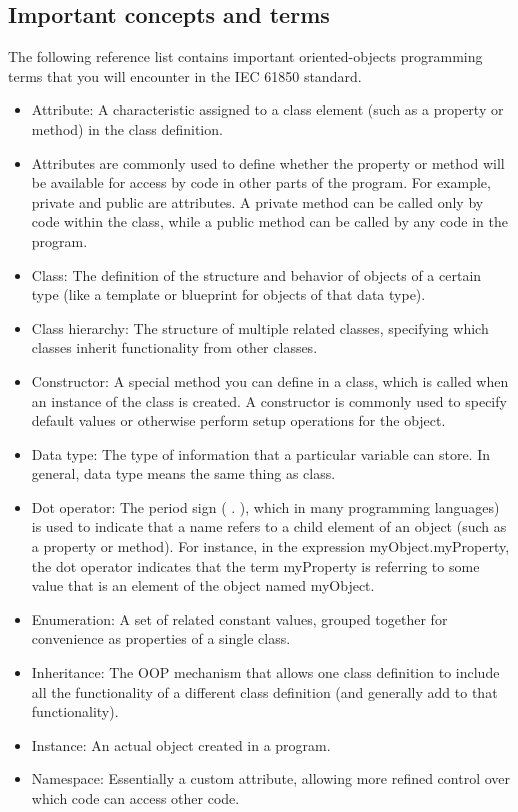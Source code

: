 \subsection{Important concepts and terms}

The following reference list contains important 
oriented-objects programming terms 
that you will encounter in the IEC 61850 standard. 
\begin{itemize}
  \item Attribute: A characteristic assigned to a class 
  element (such as a property or method) in the class definition.
  \item Attributes are commonly used to define whether 
  the property or method will be available for access by 
  code in other parts of the program. For example, 
  private and public are attributes. A private method 
  can be called only by code within the class, while a public 
  method can be called by any code in the program.
  \item Class: The definition of the structure and behavior 
  of objects of a certain type (like a template or 
  blueprint for objects of that data type).
  \item Class hierarchy: The structure of multiple 
  related classes, specifying which classes inherit 
  functionality from other classes.
  \item Constructor: A special method you can define in 
  a class, which is called when an instance of the 
  class is created. A constructor is commonly used to 
  specify default values or otherwise perform setup 
  operations for the object.
  \item Data type: The type of information that a 
  particular variable can store. In general, data 
  type means the same thing as class.
  \item Dot operator: The period sign ( . ), which 
  in many programming languages) is used to 
  indicate that a name refers 
  to a child element of an object (such as a 
  property or method). For instance, in the expression 
  myObject.myProperty, the dot operator indicates 
  that the term  myProperty is referring to some 
  value that is an element of the object named myObject.
  \item Enumeration: A set of related constant 
  values, grouped together for convenience as properties 
  of a single class.
  \item Inheritance: The OOP mechanism that allows one 
  class definition to include all the functionality 
  of a different class definition (and generally 
  add to that functionality).
  \item Instance: An actual object created in a program.
  \item Namespace: Essentially a custom attribute, 
  allowing more refined control over which code can 
  access other code.   
\end{itemize}

